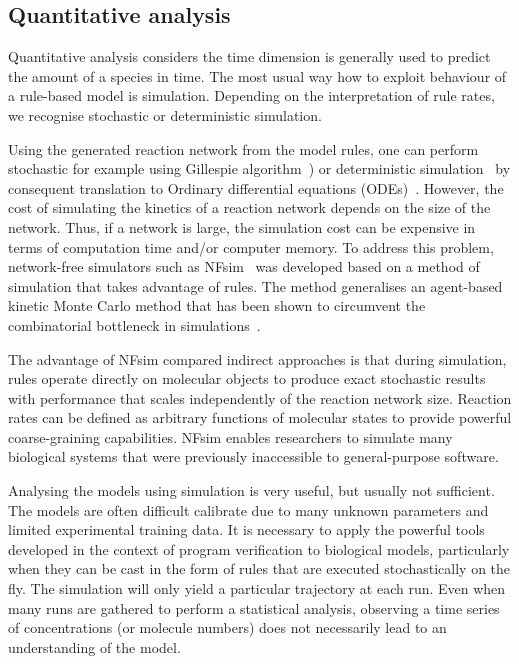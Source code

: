 \documentclass[11pt,a4paper]{report}
\begin{document}
\subsection{Quantitative analysis}

Quantitative analysis considers the time dimension is generally used to predict the amount of a species in time. The most usual way how to exploit behaviour of a rule-based model is simulation. Depending on the interpretation of rule rates, we recognise stochastic or deterministic simulation. 

Using the generated reaction network from the model rules, one can perform stochastic for example using Gillespie algorithm~\cite{GILLESPIE1976403}) or deterministic simulation~\cite{Poole2000} by consequent translation to Ordinary differential equations (ODEs)~\cite{higham2008modeling}. However, the cost of simulating the kinetics of a reaction network depends on the size of the network. Thus, if a network is large, the simulation cost can be expensive in terms of computation time and/or computer memory. To address this problem, network-free simulators such as NFsim~\cite{sneddon2011efficient} was developed based on a method of simulation that takes advantage of rules. The method generalises an agent-based kinetic Monte Carlo method that has been shown to circumvent the combinatorial bottleneck in simulations~\cite{yang2008kinetic}.

The advantage of NFsim compared indirect approaches is that during simulation, rules operate directly on molecular objects to produce exact stochastic results with performance that scales independently of the reaction network size. Reaction rates can be defined as arbitrary functions of molecular states to provide powerful coarse-graining capabilities. NFsim enables researchers to simulate many biological systems that were previously inaccessible to general-purpose software.

Analysing the models using simulation is very useful, but usually not sufficient. The models are often difficult calibrate due to many unknown parameters and limited experimental training data. It is necessary to apply the powerful tools developed in the context of program verification to biological models, particularly when
they can be cast in the form of rules that are executed stochastically on the fly. The simulation will only yield a particular trajectory at each run. Even when many runs are gathered to perform a statistical analysis, observing a time series of concentrations (or molecule numbers) does not necessarily lead to an understanding of the model.
\end{document}
